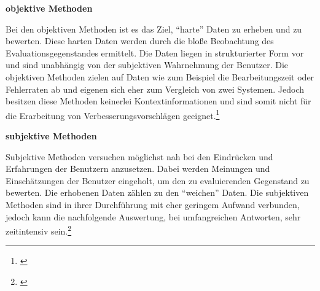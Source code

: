 \textbf{objektive Methoden}

Bei den objektiven Methoden ist es das Ziel, \enquote{harte} Daten zu erheben und zu bewerten. Diese harten Daten werden durch die bloße Beobachtung des Evaluationsgegenstandes ermittelt. Die Daten liegen in strukturierter Form vor und sind unabhängig von der subjektiven Wahrnehmung der Benutzer. Die objektiven Methoden zielen auf Daten wie zum Beispiel die Bearbeitungszeit oder Fehlerraten ab und eigenen sich eher zum Vergleich von zwei Systemen. Jedoch besitzen diese Methoden keinerlei Kontextinformationen und sind somit nicht für die Erarbeitung von Verbesserungsvorschlägen geeignet.\footnote{\cite[vgl.][17]{Hegner2003}}

\textbf{subjektive Methoden}

Subjektive Methoden versuchen möglichst nah bei den Eindrücken und Erfahrungen der Benutzern anzusetzen. Dabei werden Meinungen und Einschätzungen der Benutzer eingeholt, um den zu evaluierenden Gegenstand zu bewerten. Die erhobenen Daten zählen zu den \enquote{weichen} Daten. Die subjektiven Methoden sind in ihrer Durchführung mit eher geringem Aufwand verbunden, jedoch kann die nachfolgende Auswertung, bei umfangreichen Antworten, sehr zeitintensiv sein.\footnote{\cite[vgl.][18]{Hegner2003}}

